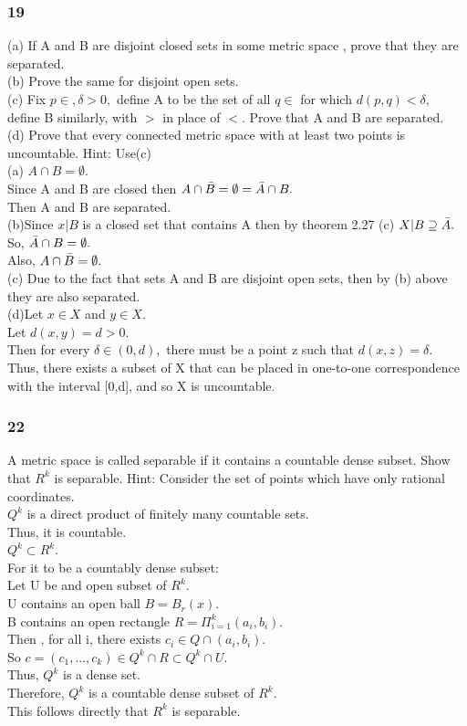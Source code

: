 \subsubsection*{19}
(a) If A and B are disjoint closed sets in some metric space , prove that they are separated. \\ 
(b) Prove the same for disjoint open sets. \\ 
(c) Fix $p \in , \delta >0,$ define A to be the set of all $q \in $ for which $d(p,q)< \delta,$ define B similarly, with $>$ in place of $<.$ Prove that A and B are separated. \\ 
(d) Prove that every connected metric space with at least two points is uncountable. Hint: Use(c)\\ 
(a) $A \cap B = \emptyset.$ \\ 
Since A and B are closed then $A \cap \Bar{B}=\emptyset=\Bar{A} \cap B.$\\ 
Then A and B are separated. \\ 
(b)Since $x |B$ is a closed set that contains A then by theorem 2.27 (c) $X | B \supseteq \Bar{A}.$\\ 
So, $\Bar{A} \cap B= \emptyset.$ \\ 
Also, $A \cap \Bar{B}= \emptyset.$\\ 
(c) Due to the fact that sets A and B are disjoint open sets, then by (b) above they are also separated. \\ 
(d)Let $x \in X$ and $y \in X.$\\ 
Let $ d(x,y)=d>0.$\\ 
Then for every $\delta \in (0,d),$ there must be a point z such that $d(x,z)=\delta.$\\ 
Thus, there exists a subset of X that can be placed in one-to-one correspondence with the interval [0,d], and so X is uncountable. 
\subsubsection*{22}
A metric space is called separable if it contains a countable dense subset. Show that $R^k$ is separable. Hint: Consider the set of points which have only rational coordinates. \\ 
$Q^k$ is a direct product of finitely many countable sets. \\ 
Thus, it is countable. \\ 
$Q^k \subset R^k.$\\ 
For it to be a countably dense subset: \\ 
Let U be and open subset of $R^k.$\\ 
U contains an open ball $B=B_r(x).$\\ 
B contains an open rectangle $R= \Pi_{i=1}^k(a_i,b_i).$\\ 
Then , for all i, there exists $c_i \in Q \cap(a_i,b_i).$\\ 
So $c=(c_1,...,c_k)\in Q^k \cap R \subset Q^k \cap U.$ \\ 
Thus, $Q^k$ is a dense set. \\ 
Therefore, $Q^k$ is a countable dense subset of $R^k.$ \\
This follows directly that $R^k$ is separable. 
